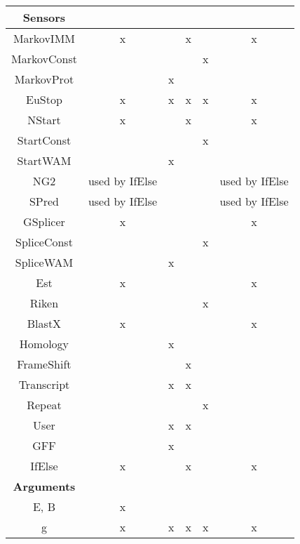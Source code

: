 \documentclass[a4paper,11pt]{article}
\begin{document}
\begin{center}
\begin{tabular}{|c|c|c|c|c|c|}
{\bf Sensors}& & & & &\\ \hline \hline
MarkovIMM      &       x        &                   &     x    &   & x\\ \hline
MarkovConst    &                &                   &          & x & \\ \hline
MarkovProt     &                &        x          &          &   & \\ \hline
EuStop         &       x        &        x          &     x    & x & x\\ \hline
NStart         &       x        &                   &     x    &   & x\\ \hline
StartConst     &                &                   &          & x & \\ \hline
StartWAM       &                &        x          &          &   & \\ \hline
NG2            & used by IfElse &                   &          &   & used by IfElse\\  \hline
SPred          & used by IfElse &                   &          &   & used by IfElse\\  \hline
GSplicer       &       x        &                   &          &   & x\\ \hline
SpliceConst    &                &                   &          & x & \\ \hline
SpliceWAM      &                &        x          &          &   & \\ \hline
Est            &       x        &                   &          &   & x\\  \hline
Riken          &                &                   &          & x & \\ \hline
BlastX         &       x        &                   &          &   & x\\  \hline
Homology       &                &        x          &          &   & \\ \hline
FrameShift     &                &                   &    x     &   & \\ \hline
Transcript     &                &        x          &    x     &   & \\ \hline
Repeat         &                &                   &          & x & \\ \hline
User           &                &        x          &    x     &   & \\ \hline
GFF            &                &        x          &          &   & \\ \hline
IfElse         &       x        &                   &    x     &   & x\\ \hline \hline

{\bf Arguments}& & & & &\\ \hline \hline
E, B           &       x        &                   &          &   &\\ \hline 
g              &       x        &        x          &    x     & x & x\\ \hline
\end{tabular}
\end{center}
\vspace{0.5cm}
\end{document}
